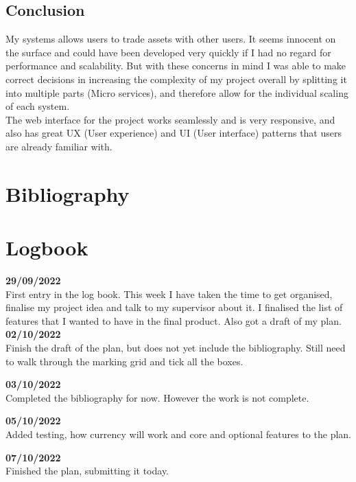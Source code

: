 \documentclass[titlepage]{article}
\begin{document}
\subsection{Conclusion}
My systems allows users to trade assets with other users. It seems innocent on the surface and could have been developed very quickly if I had no regard for performance and scalability. But with these concerns in mind I was able to make correct decisions in increasing the complexity of my project overall by splitting it into multiple parts (Micro services), and therefore allow for the individual scaling of each system. \\

The web interface for the project works seamlessly and is very responsive, and also has great UX (User experience) and UI (User interface) patterns that users are already familiar with.

\section{Bibliography}




\pagebreak
\section{Logbook}

\textbf{29/09/2022} \\
First entry in the log book. This week I have taken the time to get organised, finalise my project idea and talk to my supervisor about it. I finalised the list of features that I wanted to have in the final product. Also got a draft of my plan.
\\

\noindent
\textbf{02/10/2022} \\
Finish the draft of the plan, but does not yet include the bibliography. Still need to walk through the marking grid and tick all the boxes.

\textbf{03/10/2022} \\
Completed the bibliography for now. However the work is not complete.

\textbf{05/10/2022} \\
Added testing, how currency will work and core and optional features to the plan.

\textbf{07/10/2022} \\
Finished the plan, submitting it today.
\end{document}
